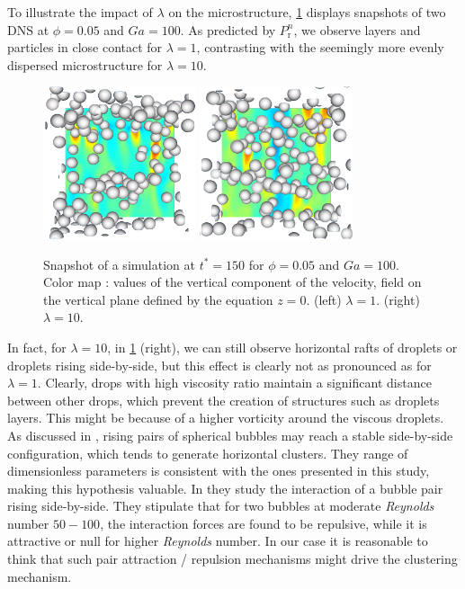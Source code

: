 To illustrate the impact of $\lambda$ on the microstructure, \ref{fig:images} displays snapshots of two DNS at $\phi = 0.05$ and $Ga = 100$. 
As predicted by $P_\text{r}^n$, we observe layers and particles in close contact for $\lambda = 1$, contrasting with the seemingly more evenly dispersed microstructure for $\lambda = 10$.
\begin{figure}[h!]
   \centering
   \includegraphics[width=0.4\textwidth]{image/HOMOGENEOUS_NEW/P_PHI_5_l_10_Ga_100.png}
   \includegraphics[width=0.4\textwidth]{image/HOMOGENEOUS_NEW/P_PHI_5_l_1_Ga_100.png}
   \caption{Snapshot of a simulation at $t^* = 150$ for $\phi=0.05$ and $Ga=100$.
   Color map : values of the vertical component of the velocity, field on the vertical plane defined by the equation $z=0$. 
   (left)  $\lambda = 1$.
   (right)  $\lambda = 10$.
   }
   \label{fig:images}
\end{figure}
In fact, for $\lambda = 10$, in \ref{fig:images} (right), we can still observe horizontal rafts of droplets or droplets rising side-by-side, but this effect is clearly not as pronounced as for $\lambda = 1$. 
Clearly, drops with high viscosity ratio maintain a significant distance between other drops, which prevent the creation of structures such as droplets layers.
This might be because of a higher vorticity around the viscous droplets.   
As discussed in \citet{zhang2021three}, rising pairs of spherical bubbles may reach a stable side-by-side configuration, which tends to generate horizontal clusters.
They range of dimensionless parameters is consistent with the ones presented in this study, making this hypothesis valuable. 
In \citet{legendre2003hydrodynamic} they study the interaction of a bubble pair rising side-by-side. 
They stipulate that for two bubbles at moderate \textit{Reynolds} number $50-100$, the interaction forces are found to be repulsive, while it is attractive or null for higher \textit{Reynolds} number. 
In our case it is reasonable to think that such pair attraction / repulsion mechanisms might drive the clustering mechanism.

